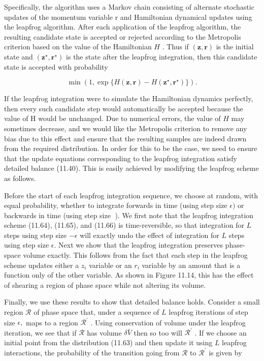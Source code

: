 \documentclass[
  10
]{article}
\begin{document}
Specifically, the algorithm uses a Markov chain consisting of alternate
stochastic updates of the momentum variable r and Hamiltonian dynamical
updates using the leapfrog algorithm. After each application of the
leapfrog algorithm, the resulting candidate state is accepted or
rejected according to the Metropolis criterion based on the value of the
Hamiltonian \(H\) . Thus if \(( \mathbf { z } , \mathbf { r } )\) is the
initial state and
\(\left( \mathbf { z } ^ { \star } , \mathbf { r } ^ { \star } \right)\)
is the state after the leapfrog integration, then this candidate state
is accepted with probability

\[
\min \left(1, \exp \{H (\mathbf {z}, \mathbf {r}) - H (\mathbf {z} ^ {\star}, \mathbf {r} ^ {\star}) \}\right).\tag{11.67}
\]

If the leapfrog integration were to simulate the Hamiltonian dynamics
perfectly, then every such candidate step would automatically be
accepted because the value of H would be unchanged. Due to numerical
errors, the value of \(H\) may sometimes decrease, and we would like the
Metropolis criterion to remove any bias due to this effect and ensure
that the resulting samples are indeed drawn from the required
distribution. In order for this to be the case, we need to ensure that
the update equations corresponding to the leapfrog integration satisfy
detailed balance (11.40). This is easily achieved by modifying the
leapfrog scheme as follows.

Before the start of each leapfrog integration sequence, we choose at
random, with equal probability, whether to integrate forwards in time
(using step size \(\epsilon )\) or backwards in time (using step size ).
We first note that the leapfrog integration scheme (11.64), (11.65), and
(11.66) is time-reversible, so that integration for \(L\) steps using
step size \(- \epsilon\) will exactly undo the effect of integration for
\(L\) steps using step size \(\epsilon .\) Next we show that the
leapfrog integration preserves phase-space volume exactly. This follows
from the fact that each step in the leapfrog scheme updates either a
\(z _ { i }\) variable or an \(r _ { i }\) variable by an amount that is
a function only of the other variable. As shown in Figure 11.14, this
has the effect of shearing a region of phase space while not altering
its volume.

Finally, we use these results to show that detailed balance holds.
Consider a small region \(\mathcal { R }\) of phase space that, under a
sequence of \(L\) leapfrog iterations of step size \(\epsilon ,\) maps
to a region \(\mathcal { R } ^ { \prime }\) . Using conservation of
volume under the leapfrog iteration, we see that if \(\mathcal { R }\)
has volume \(\delta \bar { V }\) then so too will
\(\mathcal { R } ^ { \prime }\) . If we choose an initial point from the
distribution (11.63) and then update it using \(L\) leapfrog
interactions, the probability of the transition going from
\(\mathcal { R }\) to \(\mathcal { R } ^ { \prime }\) is given by
\end{document}
